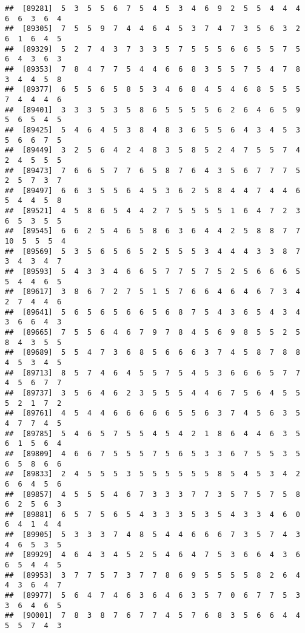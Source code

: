 \documentclass[
]{book}
\begin{document}
\begin{verbatim}
##  [89281]  5  3  5  5  6  7  5  4  5  3  4  6  9  2  5  5  4  4  4  6  6  3  6  4
##  [89305]  7  5  5  9  7  4  4  6  4  5  3  7  4  7  3  5  6  3  2  6  1  6  4  5
##  [89329]  5  2  7  4  3  7  3  3  5  7  5  5  5  6  6  5  5  7  5  6  4  3  6  3
##  [89353]  7  8  4  7  7  5  4  4  6  6  8  3  5  5  7  5  4  7  8  3  4  4  5  8
##  [89377]  6  5  5  6  5  8  5  3  4  6  8  4  5  4  6  8  5  5  5  7  4  4  4  6
##  [89401]  3  3  3  5  3  5  8  6  5  5  5  5  6  2  6  4  6  5  9  5  6  5  4  5
##  [89425]  5  4  6  4  5  3  8  4  8  3  6  5  5  6  4  3  4  5  3  5  6  6  7  5
##  [89449]  3  2  5  6  4  2  4  8  3  5  8  5  2  4  7  5  5  7  4  2  4  5  5  5
##  [89473]  7  6  6  5  7  7  6  5  8  7  6  4  3  5  6  7  7  7  5  2  5  7  3  7
##  [89497]  6  6  3  5  5  6  4  5  3  6  2  5  8  4  4  7  4  4  6  5  4  4  5  8
##  [89521]  4  5  8  6  5  4  4  2  7  5  5  5  5  1  6  4  7  2  3  6  5  3  5  5
##  [89545]  6  6  2  5  4  6  5  8  6  3  6  4  4  2  5  8  8  7  7 10  5  5  5  4
##  [89569]  5  3  5  6  5  6  5  2  5  5  5  3  4  4  4  3  3  8  7  3  4  3  4  7
##  [89593]  5  4  3  3  4  6  6  5  7  7  5  7  5  2  5  6  6  6  5  5  4  4  6  5
##  [89617]  3  8  6  7  2  7  5  1  5  7  6  6  4  6  4  6  7  3  4  2  7  4  4  6
##  [89641]  5  6  5  6  5  6  6  5  6  8  7  5  4  3  6  5  4  3  4  3  6  6  4  3
##  [89665]  7  5  5  6  4  6  7  9  7  8  4  5  6  9  8  5  5  2  5  8  4  3  5  5
##  [89689]  5  5  4  7  3  6  8  5  6  6  6  3  7  4  5  8  7  8  8  4  5  3  4  5
##  [89713]  8  5  7  4  6  4  5  5  7  5  4  5  3  6  6  6  5  7  7  4  5  6  7  7
##  [89737]  3  5  6  4  6  2  3  5  5  5  4  4  6  7  5  6  4  5  5  5  2  1  7  2
##  [89761]  4  5  4  4  6  6  6  6  6  5  5  6  3  7  4  5  6  3  5  4  7  7  4  5
##  [89785]  5  4  6  5  7  5  5  4  5  4  2  1  8  6  4  4  6  3  5  6  1  5  6  4
##  [89809]  4  6  6  7  5  5  5  7  5  6  5  3  3  6  7  5  5  3  5  6  5  8  6  6
##  [89833]  2  4  5  5  5  3  5  5  5  5  5  5  8  5  4  5  3  4  2  6  6  4  5  6
##  [89857]  4  5  5  5  4  6  7  3  3  3  7  7  3  5  7  5  7  5  8  6  2  5  6  3
##  [89881]  6  5  7  5  6  5  4  3  3  3  5  3  5  4  3  3  4  6  0  6  4  1  4  4
##  [89905]  5  3  3  3  7  4  8  5  4  4  6  6  6  7  3  5  7  4  3  4  6  5  3  5
##  [89929]  4  6  4  3  4  5  2  5  4  6  4  7  5  3  6  6  4  3  6  6  5  4  4  5
##  [89953]  3  7  7  5  7  3  7  7  8  6  9  5  5  5  5  8  2  6  4  4  3  6  4  7
##  [89977]  5  6  4  7  4  6  3  6  4  6  3  5  7  0  6  7  7  5  3  3  6  4  6  5
##  [90001]  7  8  3  8  7  6  7  7  4  5  7  6  8  3  5  6  6  4  4  5  5  7  4  3

\end{verbatim}
\end{document}
